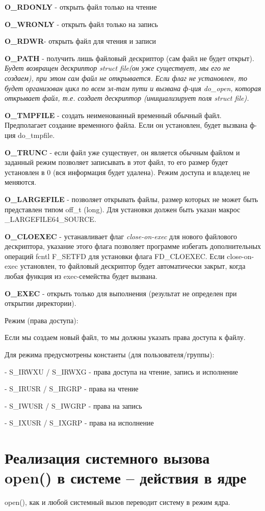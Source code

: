 \textbf{O\_RDONLY} - открыть файл только на чтение

\textbf{O\_WRONLY} - открыть файл только на запись

\textbf{O\_RDWR}- открыть файл для чтения и записи

\textbf{O\_PATH} - получить лишь файловый дескриптор (сам файл не будет открыт). \textit{ Будет возвращен дескриптор struct file(он уже  существует, мы его не создаем), при этом сам файл не открывается. Если флаг не установлен, то будет организован цикл по всем эл-там пути и вызвана ф-ция do\_open, которая открывает файл, т.е. создает дескриптор (инициализирует поля struct file).}


\textbf{O\_TMPFILE} - создать неименованный временный обычный файл. Предполагает создание временного файла. Если он установлен, будет вызвана ф-ция do\_tmpfile.

\textbf{O\_TRUNC} - если файл уже существует, он является обычным файлом и заданный режим позволяет записывать в этот файл, то его размер будет установлен в 0 (вся информация будет удалена). Режим доступа и владелец не меняются.

\textbf{O\_LARGEFILE} - позволяет открывать файлы, размер которых не может
быть представлен типом off\_t (long). Для установки должен быть указан макрос 
\_LARGEFILE64\_SOURCE.

\textbf{O\_CLOEXEC} - устанавливает флаг \textit{close-on-exec} для нового файлового дескриптора, указание этого флага позволяет программе избегать дополнительных операций fcntl F\_SETFD для установки флага FD\_CLOEXEC. Если close-on-exec установлен, то файловый дескриптор будет автоматически закрыт, когда любая функция из exec-семейства будет вызвана.

\textbf{O\_EXEC} - открыть только для выполнения (результат не определен при открытии директории).

Режим (права доступа): 

Если мы создаем новый файл, то мы должны указать права доступа к файлу. 

Для режима предусмотрены константы (для пользователя/группы):

-  S\_IRWXU / S\_IRWXG - права доступа на чтение, запись и исполнение

- S\_IRUSR / S\_IRGRP - права на чтение

- S\_IWUSR / S\_IWGRP - права на запись

- S\_IXUSR / S\_IXGRP - права на исполнение

\section{Реализация системного вызова open() в системе – действия в ядре}
open(), как и любой системный вызов переводит систему в режим ядра.

